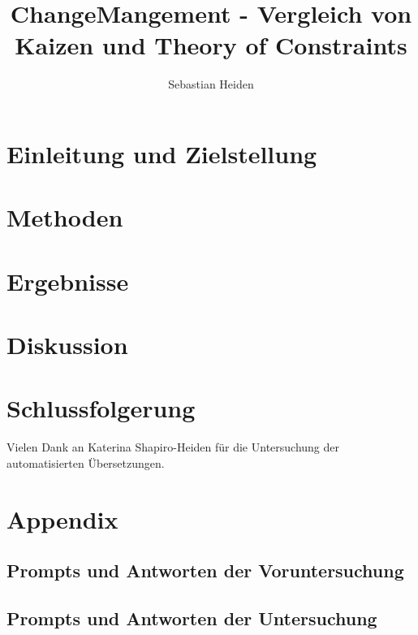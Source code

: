 \documentclass[acmlarge,authorversion,nonacm]{acmart}
\begin{document}
	\title{ChangeMangement - Vergleich von Kaizen und Theory of Constraints}
	
	\author{Sebastian Heiden}

\begin{abstract}

\end{abstract}




\maketitle

\section{Einleitung und Zielstellung}


\section{Methoden}\label{sec:methods}


\section{Ergebnisse}\label{sec:results}


\section{Diskussion}\label{sec:discussion}


\section{Schlussfolgerung}\label{sec:conclusion}


\begin{acks}
Vielen Dank an Katerina Shapiro-Heiden für die Untersuchung der automatisierten Übersetzungen.
\end{acks}




\newpage
\appendix

\section{Appendix}

\subsection{Prompts und Antworten der Voruntersuchung}


\subsection{Prompts und Antworten der Untersuchung}
\end{document}
